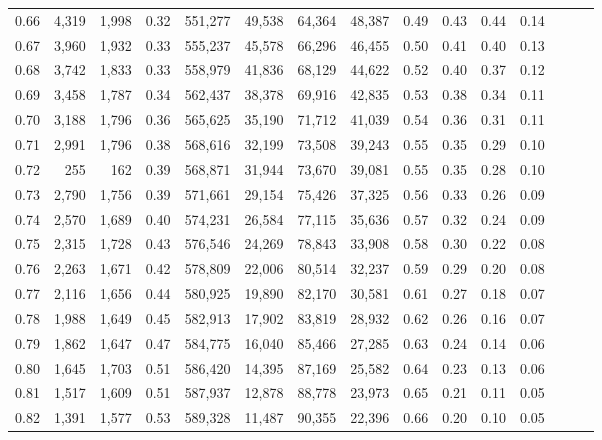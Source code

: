 \begin{tabular}{rrrrrrrrrrrrrrr}
0.66 &   4,319 &  1,998 &  0.32 &  551,277 &   49,538 &   64,364 &   48,387 &  0.49 &  0.43 &  0.44 &      0.14 \\
0.67 &   3,960 &  1,932 &  0.33 &  555,237 &   45,578 &   66,296 &   46,455 &  0.50 &  0.41 &  0.40 &      0.13 \\
0.68 &   3,742 &  1,833 &  0.33 &  558,979 &   41,836 &   68,129 &   44,622 &  0.52 &  0.40 &  0.37 &      0.12 \\
0.69 &   3,458 &  1,787 &  0.34 &  562,437 &   38,378 &   69,916 &   42,835 &  0.53 &  0.38 &  0.34 &      0.11 \\
0.70 &   3,188 &  1,796 &  0.36 &  565,625 &   35,190 &   71,712 &   41,039 &  0.54 &  0.36 &  0.31 &      0.11 \\
0.71 &   2,991 &  1,796 &  0.38 &  568,616 &   32,199 &   73,508 &   39,243 &  0.55 &  0.35 &  0.29 &      0.10 \\
0.72 &     255 &    162 &  0.39 &  568,871 &   31,944 &   73,670 &   39,081 &  0.55 &  0.35 &  0.28 &      0.10 \\
0.73 &   2,790 &  1,756 &  0.39 &  571,661 &   29,154 &   75,426 &   37,325 &  0.56 &  0.33 &  0.26 &      0.09 \\
0.74 &   2,570 &  1,689 &  0.40 &  574,231 &   26,584 &   77,115 &   35,636 &  0.57 &  0.32 &  0.24 &      0.09 \\
0.75 &   2,315 &  1,728 &  0.43 &  576,546 &   24,269 &   78,843 &   33,908 &  0.58 &  0.30 &  0.22 &      0.08 \\
0.76 &   2,263 &  1,671 &  0.42 &  578,809 &   22,006 &   80,514 &   32,237 &  0.59 &  0.29 &  0.20 &      0.08 \\
0.77 &   2,116 &  1,656 &  0.44 &  580,925 &   19,890 &   82,170 &   30,581 &  0.61 &  0.27 &  0.18 &      0.07 \\
0.78 &   1,988 &  1,649 &  0.45 &  582,913 &   17,902 &   83,819 &   28,932 &  0.62 &  0.26 &  0.16 &      0.07 \\
0.79 &   1,862 &  1,647 &  0.47 &  584,775 &   16,040 &   85,466 &   27,285 &  0.63 &  0.24 &  0.14 &      0.06 \\
0.80 &   1,645 &  1,703 &  0.51 &  586,420 &   14,395 &   87,169 &   25,582 &  0.64 &  0.23 &  0.13 &      0.06 \\
0.81 &   1,517 &  1,609 &  0.51 &  587,937 &   12,878 &   88,778 &   23,973 &  0.65 &  0.21 &  0.11 &      0.05 \\
0.82 &   1,391 &  1,577 &  0.53 &  589,328 &   11,487 &   90,355 &   22,396 &  0.66 &  0.20 &  0.10 &      0.05 \\

\end{tabular}
